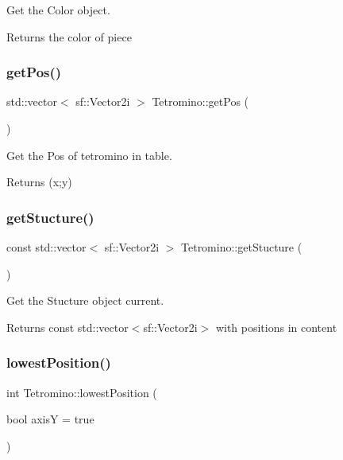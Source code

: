 Get the Color object. 

\begin{DoxyReturn}{Returns}
the color of piece 
\end{DoxyReturn}
\mbox{\label{classTetromino_a8c9202a6d41354fd5555cca89cec0703}} 
\subsubsection{\texorpdfstring{get\+Pos()}{getPos()}}
{\footnotesize\ttfamily std\+::vector$<$ sf\+::\+Vector2i $>$ Tetromino\+::get\+Pos (\begin{DoxyParamCaption}{ }\end{DoxyParamCaption})}



Get the Pos of tetromino in table. 

\begin{DoxyReturn}{Returns}
(x;y) 
\end{DoxyReturn}
\mbox{\label{classTetromino_abbad824f47a492bdc96810908903c7ac}} 
\subsubsection{\texorpdfstring{get\+Stucture()}{getStucture()}}
{\footnotesize\ttfamily const std\+::vector$<$ sf\+::\+Vector2i $>$ Tetromino\+::get\+Stucture (\begin{DoxyParamCaption}{ }\end{DoxyParamCaption})}



Get the Stucture object current. 

\begin{DoxyReturn}{Returns}
const std\+::vector$<$sf\+::\+Vector2i$>$ with positions in content 
\end{DoxyReturn}
\mbox{\label{classTetromino_aa77965d8aa40ea448b5e8c5e288910d0}} 
\subsubsection{\texorpdfstring{lowest\+Position()}{lowestPosition()}}
{\footnotesize\ttfamily int Tetromino\+::lowest\+Position (\begin{DoxyParamCaption}\item[{bool}]{axisY = {\ttfamily true} }\end{DoxyParamCaption})}



